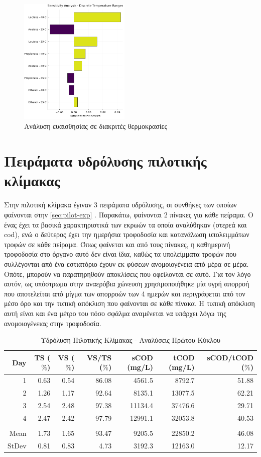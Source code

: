 \documentclass[11pt]{report}
\begin{document}
\begin{figure}[htbp]
\centering
\includegraphics[width=200px]{../plots/sensitivity/temperature_tornado.png}
\caption{\label{fig:orgef9fb42}Ανάλυση ευαισθησίας σε διακριτές θερμοκρασίες}
\end{figure}

\section{Πειράματα υδρόλυσης πιλοτικής κλίμακας}
\label{sec:org80ee537}
Στην πιλοτική κλίμακα έγιναν 3 πειράματα υδρόλυσης, οι συνθήκες των οποίων φαίνονται στην \autoref{sec:pilot-exp} . Παρακάτω, φαίνονται 2 πίνακες για κάθε πείραμα. Ο ένας έχει τα βασικά χαρακτηριστικά των εκρωών τα οποία αναλύθηκαν (στερεά και \acrshort{cod}), ενώ ο δεύτερος έχει την ημερήσια τροφοδοσία και κατανάλωση υπολειμμάτων τροφών σε κάθε πείραμα. Όπως φαίνεται και από τους πίνακες, η καθημερινή τροφοδοσία στο όργανο αυτό δεν είναι ίδια, καθώς τα υπολείμματα τροφών που συλλέγονται από ένα εστιατόριο έχουν εκ φύσεων ανομοιογένεια από μέρα σε μέρα. Οπότε, μπορούν να παρατηρηθούν αποκλίσεις που οφείλονται σε αυτό. Για τον λόγο αυτόν, ως υπόστρωμα στην αναερόβια χώνευση χρησιμοποιήθηκε μία υγρή απορροή που αποτελείται από μίγμα των απορροών των 4 ημερών και περιγράφεται από τον μέσο όρο και την τυπική απόκλιση που φαίνονται σε κάθε πίνακα. Η τυπική απόκλιση αυτή είναι και ένα μέτρο του πόσο σφάλμα αναμένεται να υπάρχει λόγω της ανομοιογένειας στην τροφοδοσία.


\begin{table}[htbp]
\caption{\label{tab:orge14e656}Υδρόλυση Πιλοτικής Κλίμακας - Αναλύσεις Πρώτου Κύκλου}
\centering
\begin{tabular}{rrrrrrr}
Day & TS (\(\%\)) & VS (\(\%\)) & VS/TS (\(\%\)) & sCOD (mg/L) & tCOD (mg/L) & sCOD/tCOD (\(\%\))\\[0pt]
\hline
1 & 0.63 & 0.54 & 86.08 & 4561.5 & 8792.7 & 51.88\\[0pt]
2 & 1.26 & 1.17 & 92.64 & 8135.1 & 13077.5 & 62.21\\[0pt]
3 & 2.54 & 2.48 & 97.38 & 11134.4 & 37476.6 & 29.71\\[0pt]
4 & 2.47 & 2.42 & 97.79 & 12991.1 & 32053.8 & 40.53\\[0pt]
 &  &  &  &  &  & \\[0pt]
Mean & 1.73 & 1.65 & 93.47 & 9205.5 & 22850.2 & 46.08\\[0pt]
StDev & 0.81 & 0.83 & 4.73 & 3192.3 & 12163.0 & 12.17\\[0pt]
\end{tabular}
\end{table}
\end{document}
